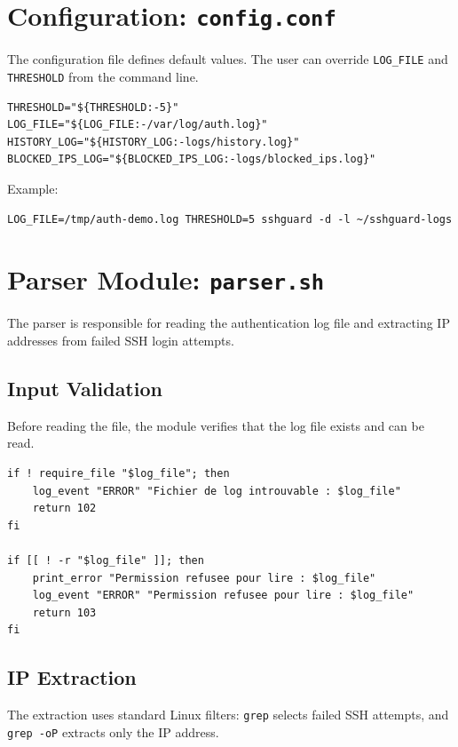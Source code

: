 \documentclass[12pt,a4paper]{article}
\begin{document}
\section{Configuration: \texttt{config.conf}}

The configuration file defines default values. The user can override \texttt{LOG\_FILE} and
\texttt{THRESHOLD} from the command line.

\begin{lstlisting}[style=bashstyle]
THRESHOLD="${THRESHOLD:-5}"
LOG_FILE="${LOG_FILE:-/var/log/auth.log}"
HISTORY_LOG="${HISTORY_LOG:-logs/history.log}"
BLOCKED_IPS_LOG="${BLOCKED_IPS_LOG:-logs/blocked_ips.log}"
\end{lstlisting}

Example:

\begin{lstlisting}[style=bashstyle]
LOG_FILE=/tmp/auth-demo.log THRESHOLD=5 sshguard -d -l ~/sshguard-logs
\end{lstlisting}

\section{Parser Module: \texttt{parser.sh}}

The parser is responsible for reading the authentication log file and extracting IP addresses
from failed SSH login attempts.

\subsection{Input Validation}

Before reading the file, the module verifies that the log file exists and can be read.

\begin{lstlisting}[style=bashstyle]
if ! require_file "$log_file"; then
    log_event "ERROR" "Fichier de log introuvable : $log_file"
    return 102
fi

if [[ ! -r "$log_file" ]]; then
    print_error "Permission refusee pour lire : $log_file"
    log_event "ERROR" "Permission refusee pour lire : $log_file"
    return 103
fi
\end{lstlisting}

\subsection{IP Extraction}

The extraction uses standard Linux filters:
\texttt{grep} selects failed SSH attempts, and \texttt{grep -oP} extracts only the IP address.
\end{document}
